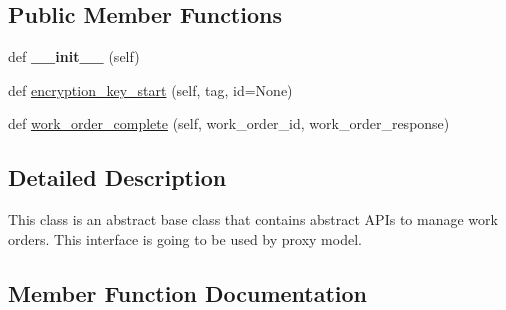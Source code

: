 \subsection*{Public Member Functions}
\begin{DoxyCompactItemize}
\item 
\mbox{\label{classavalon__sdk_1_1connector_1_1interfaces_1_1work__order__proxy_1_1WorkOrderProxy_a3f90335f75b4703148fbe2aef058bd93}} 
def {\bfseries \+\_\+\+\_\+init\+\_\+\+\_\+} (self)
\item 
def \hyperlink{classavalon__sdk_1_1connector_1_1interfaces_1_1work__order__proxy_1_1WorkOrderProxy_a64f36c9534e5e4f5559b78da6edad2c6}{encryption\+\_\+key\+\_\+start} (self, tag, id=None)
\item 
def \hyperlink{classavalon__sdk_1_1connector_1_1interfaces_1_1work__order__proxy_1_1WorkOrderProxy_a8d0ab392d8e30c98f854f8cc87fee33c}{work\+\_\+order\+\_\+complete} (self, work\+\_\+order\+\_\+id, work\+\_\+order\+\_\+response)
\end{DoxyCompactItemize}


\subsection{Detailed Description}
\begin{DoxyVerb}This class is an abstract base class that contains
abstract APIs to manage work orders.
This interface is going to be used by proxy model.
\end{DoxyVerb}
 

\subsection{Member Function Documentation}
\mbox{\label{classavalon__sdk_1_1connector_1_1interfaces_1_1work__order__proxy_1_1WorkOrderProxy_a64f36c9534e5e4f5559b78da6edad2c6}} 
